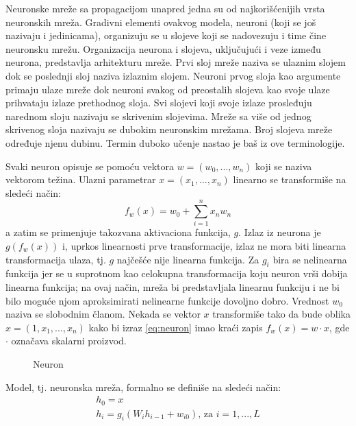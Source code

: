 Neuronske mreže sa propagacijom unapred jedna su od najkorišćenijih vrsta neuronskih mreža. Gradivni elementi ovakvog modela, neuroni (koji se još nazivaju i jedinicama), organizuju se u slojeve koji se nadovezuju i time čine neuronsku mrežu. Organizacija neurona i slojeva, uključujući i veze između neurona, predstavlja arhitekturu mreže. Prvi sloj mreže naziva se ulaznim slojem dok se poslednji sloj naziva izlaznim slojem. Neuroni prvog sloja kao argumente primaju ulaze mreže dok neuroni svakog od preostalih slojeva kao svoje ulaze prihvataju izlaze prethodnog sloja. Svi slojevi koji svoje izlaze prosleđuju narednom sloju nazivaju se skrivenim slojevima. Mreže sa više od jednog skrivenog sloja nazivaju se dubokim neuronskim mrežama.  Broj slojeva mreže određuje njenu dubinu. Termin duboko učenje nastao je baš iz ove terminologije.


\par
Svaki neuron opisuje se pomoću vektora $w = (w_0, ..., w_n)$ koji se naziva vektorom težina. Ulazni parametrar $x = (x_1, ..., x_n)$ linearno se transformiše na sledeći način:
\begin{equation}
\label{eq:neuron}
		f_w(x) = w_0 + \sum_{i=1}^{n} x_nw_n 
\end{equation}
a zatim se primenjuje takozvana aktivaciona funkcija, $g$. Izlaz iz neurona je $g(f_w(x))$ i, uprkos linearnosti prve transformacije, izlaz ne mora biti linearna transformacija ulaza, tj. $g$ najčešće nije linearna funkcija. Za $g_i$ bira se nelinearna funkcija jer se u suprotnom kao celokupna transformacija koju neuron vrši dobija linearna funkcija; na ovaj način, mreža bi predstavljala linearnu funkciju i ne bi bilo moguće njom aproksimirati nelinearne funkcije dovoljno dobro. Vrednost $w_0$ naziva se slobodnim članom. Nekada se vektor $x$ transformiše tako da bude oblika $x = (1, x_1, ..., x_n)$ kako bi izraz \eqref{eq:neuron} imao kraći zapis $f_w(x) = w \cdot x$, gde $\cdot$ označava skalarni proizvod.\\

\begin{figure}
	\centering
	\resizebox{.5\linewidth}{!}{}
	\caption{Neuron}
	\label{fig:neuron}
\end{figure}

Model, tj. neuronska mreža, formalno se definiše na sledeći način:
\begin{equation}
	\begin{gathered}
		h_0 = x  \\
	 	h_i = g_i(W_ih_{i-1} + w_{i0}) \text{,~za~} i=1, ..., L
	\end{gathered}
\end{equation}

